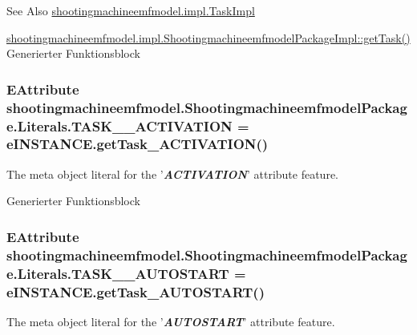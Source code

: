 \begin{DoxySeeAlso}{See Also}
\hyperlink{classshootingmachineemfmodel_1_1impl_1_1_task_impl}{shootingmachineemfmodel.\-impl.\-Task\-Impl} 

\hyperlink{classshootingmachineemfmodel_1_1impl_1_1_shootingmachineemfmodel_package_impl_a4cb0a1f2bdfdc0313e25e54cb0e15c45}{shootingmachineemfmodel.\-impl.\-Shootingmachineemfmodel\-Package\-Impl\-::get\-Task()} Generierter Funktionsblock 
\end{DoxySeeAlso}
\hypertarget{interfaceshootingmachineemfmodel_1_1_shootingmachineemfmodel_package_1_1_literals_a65c54662ff66e19e120f5c6774c3b06e}{
\subsubsection[{T\-A\-S\-K\-\_\-\-\_\-\-A\-C\-T\-I\-V\-A\-T\-I\-O\-N}]{\setlength{\rightskip}{0pt plus 5cm}E\-Attribute shootingmachineemfmodel.\-Shootingmachineemfmodel\-Package.\-Literals.\-T\-A\-S\-K\-\_\-\-\_\-\-A\-C\-T\-I\-V\-A\-T\-I\-O\-N = e\-I\-N\-S\-T\-A\-N\-C\-E.\-get\-Task\-\_\-\-A\-C\-T\-I\-V\-A\-T\-I\-O\-N()}}\label{interfaceshootingmachineemfmodel_1_1_shootingmachineemfmodel_package_1_1_literals_a65c54662ff66e19e120f5c6774c3b06e}
The meta object literal for the '{\itshape {\bfseries A\-C\-T\-I\-V\-A\-T\-I\-O\-N}}' attribute feature.

Generierter Funktionsblock \hypertarget{interfaceshootingmachineemfmodel_1_1_shootingmachineemfmodel_package_1_1_literals_afd79e5d39bbbc1e8abfc2a8972ffb89f}{
\subsubsection[{T\-A\-S\-K\-\_\-\-\_\-\-A\-U\-T\-O\-S\-T\-A\-R\-T}]{\setlength{\rightskip}{0pt plus 5cm}E\-Attribute shootingmachineemfmodel.\-Shootingmachineemfmodel\-Package.\-Literals.\-T\-A\-S\-K\-\_\-\-\_\-\-A\-U\-T\-O\-S\-T\-A\-R\-T = e\-I\-N\-S\-T\-A\-N\-C\-E.\-get\-Task\-\_\-\-A\-U\-T\-O\-S\-T\-A\-R\-T()}}\label{interfaceshootingmachineemfmodel_1_1_shootingmachineemfmodel_package_1_1_literals_afd79e5d39bbbc1e8abfc2a8972ffb89f}
The meta object literal for the '{\itshape {\bfseries A\-U\-T\-O\-S\-T\-A\-R\-T}}' attribute feature.

